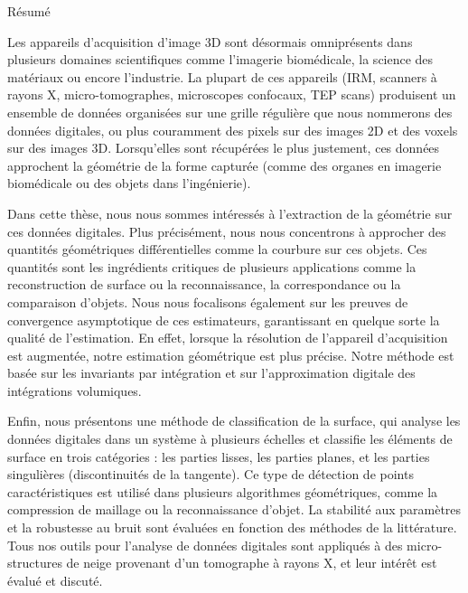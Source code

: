 \vspace*{22mm}
{Résumé}
\label{sec:abstract-french}
\vspace*{5mm}

Les appareils d'acquisition d'image 3D sont désormais omniprésents dans
plusieurs domaines scientifiques comme l'imagerie biomédicale, la science des
matériaux ou encore l'industrie. La plupart de ces appareils (IRM, scanners à
rayons X, micro-tomographes, microscopes confocaux, TEP scans) produisent un
ensemble de données organisées sur une grille régulière que nous nommerons des
données digitales, ou plus couramment des pixels sur des images 2D et des voxels
sur des images 3D. Lorsqu'elles sont récupérées le plus justement, ces données
approchent la géométrie de la forme capturée (comme des organes en imagerie
biomédicale ou des objets dans l'ingénierie).

Dans cette thèse, nous nous sommes intéressés à l'extraction de la géométrie sur
ces données digitales. Plus précisément, nous nous concentrons à approcher des
quantités géométriques différentielles comme la courbure sur ces objets. Ces
quantités sont les ingrédients critiques de plusieurs applications comme la
reconstruction de surface ou la reconnaissance, la correspondance ou la
comparaison d'objets. Nous nous focalisons également sur les preuves de
convergence asymptotique de ces estimateurs, garantissant en quelque sorte la
qualité de l'estimation. En effet, lorsque la résolution de l'appareil
d'acquisition est augmentée, notre estimation géométrique est plus précise.
Notre méthode est basée sur les invariants par intégration et sur
l'approximation digitale des intégrations volumiques.

Enfin, nous présentons une méthode de classification de la surface, qui analyse
les données digitales dans un système à plusieurs échelles et classifie les
éléments de surface en trois catégories : les parties lisses, les parties
planes, et les parties singulières (discontinuités de la tangente). Ce type de
détection de points caractéristiques est utilisé dans plusieurs algorithmes
géométriques, comme la compression de maillage ou la reconnaissance d'objet. La
stabilité aux paramètres et la robustesse au bruit sont évaluées en fonction des
méthodes de la littérature. Tous nos outils pour l'analyse de données digitales
sont appliqués à des micro-structures de neige provenant d'un tomographe à
rayons X, et leur intérêt est évalué et discuté.
